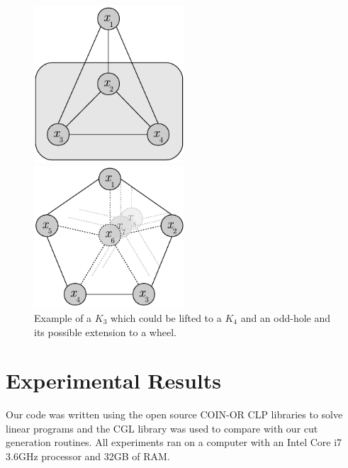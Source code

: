 \documentclass{endm}
\begin{document}
\begin{figure}	
	\begin{minipage}[h]{.5\textwidth}
		\begin{center}
			\includegraphics[width=0.5\textwidth]{clique.pdf}
		\end{center}
	\end{minipage}
	\begin{minipage}[h]{.5\textwidth}
		\begin{center}
			\includegraphics[width=0.5\textwidth]{oddHole.pdf}
		\end{center}
	\end{minipage}
	\caption{Example of a $K_{3}$ which could be lifted to a $K_{4}$ and an odd-hole and its possible extension to a wheel.} \label{figLiftings}
\end{figure}

\section{Experimental Results}\label{experiments}

Our code was written using the open source COIN-OR CLP libraries to solve linear programs and the CGL library was used to compare with our cut generation routines. All experiments ran on a computer with an Intel Core i7 3.6GHz processor and 32GB of RAM.
\end{document}
